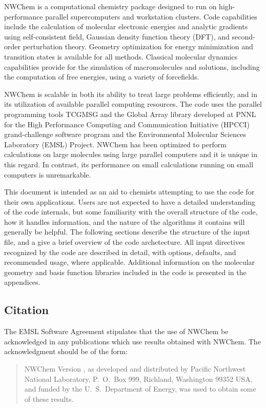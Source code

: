 \label{sec:intro}

NWChem is a computational chemistry package designed to run on
high-performance parallel supercomputers and workstation clusters.
Code capabilities include the calculation of molecular electronic
energies and analytic gradients using self-consistent field, Gaussian
density function theory (DFT), and second-order perturbation theory.
Geometry optimization for energy minimization and transition states is
available for all methods.  Classical molecular dynamics capabilities
provide for the simulation of macromolecules and solutions, including
the computation of free energies, using a variety of forcefields.

NWChem is scalable in both its ability to treat large problems
efficiently, and in its utilization of available parallel computing
resources.  The code uses the parallel programming tools TCGMSG and
the Global Array library developed at PNNL for the High Performance
Computing and Communication Initiative (HPCCI) grand-challenge
software program and the Environmental Molecular Sciences Laboratory
(EMSL) Project.  NWChem has been optimized to perform calculations on
large molecules using large parallel computers and it is unique in
this regard.  In contrast, its performance on small calculations
running on small computers is unremarkable.

This document is intended as an aid to chemists attempting to
use the code for their own applications.  Users are not expected to
have a detailed understanding of the code internals, but some
familiarity with the overall structure of the code, how it handles
information, and the nature of the algorithms it contains will
generally be helpful.  The following sections describe the structure
of the input file, and a give a brief overview of the code
archetecture.  All input directives recognized by the code are
described in detail, with options, defaults, and recommended usage,
where applicable.  Additional information on the molecular geometry
and basis function libraries included in the code is presented in the
appendices.

\subsection{Citation}

The EMSL Software Agreement stipulates that the use of NWChem be
acknowledged in any publications which use results obtained with
NWChem.  The acknowledgment should be of the form:
\begin{quote}

  NWChem Version \nwchemversion, as developed and distributed by
  Pacific Northwest National Laboratory, P.~O.~Box 999, Richland,
  Washington 99352 USA, and funded by the U.~S.~Department of Energy,
  was used to obtain some of these results.
\end{quote}

